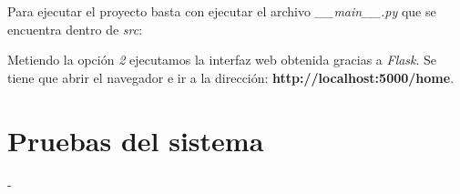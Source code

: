 
Para ejecutar el proyecto basta con ejecutar el archivo \textit{\_\_main\_\_.py} que se encuentra dentro de \textit{src}:


Metiendo la opción \textit{2} ejecutamos la interfaz web obtenida gracias a \textit{Flask}. Se tiene que abrir el navegador e ir a la dirección: \textbf{http://localhost:5000/home}.


\section{Pruebas del sistema}
-
